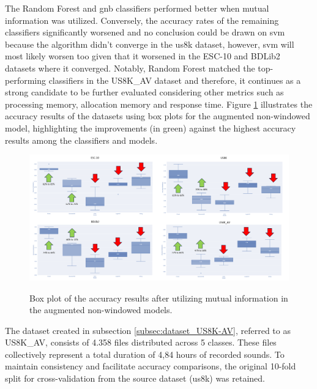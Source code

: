 The Random Forest and \gls{gnb} classifiers performed better when mutual information was utilized. Conversely, the accuracy rates of the remaining classifiers significantly worsened and no conclusion could be drawn on \gls{svm} because the algorithm didn't converge in the \gls{us8k} dataset, however, \gls{svm} will most likely worsen too given that it worsened in the ESC-10 and BDLib2 datasets where it converged. Notably, Random Forest matched the top-performing classifiers in the  US8K\_AV dataset and therefore, it continues as a strong candidate to be further evaluated considering other metrics such as processing memory, allocation memory and response time. Figure \ref{fig:results_mutual_information_boxplot} illustrates the accuracy results of the datasets using box plots for the augmented non-windowed model, highlighting the improvements (in green) against the highest accuracy results among the classifiers and models.

\begin{figure}[htbp]
    \raggedright
        \caption{Box plot of the accuracy results after utilizing mutual information in the augmented non-windowed models.}
        \includegraphics[width=1\textwidth]{resources/images/060-results/Results_classification_mutual_information_2.png}
        \label{fig:results_mutual_information_boxplot}
\end{figure}


The dataset created in subsection \ref{subsec:dataset_US8K-AV}, referred to as US8K\_AV, consists of 4.358 files distributed across 5 classes. These files collectively represent a total duration of 4,84 hours of recorded sounds. To maintain consistency and facilitate accuracy comparisons, the original 10-fold split for cross-validation from the source dataset (\gls{us8k}) was retained.

